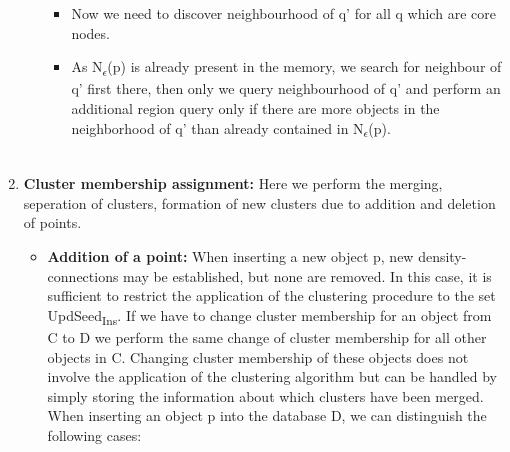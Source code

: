\documentclass[acmsmall]{acmart}
\begin{document}
\begin{enumerate}
\begin{itemize}
\begin{itemize}
            \item Now we need to discover neighbourhood of q' for all q which are core nodes.
            \item As N\textsubscript{$\epsilon$}(p) is already present in the memory, we search for neighbour of q' first there, then only we query neighbourhood of q’ and perform an additional region query only if there are more objects in the neighborhood of q’ than already contained in N\textsubscript{$\epsilon$}(p). \\ \\
        \end{itemize}
        
        
    \end{itemize}

    \item \textbf{Cluster membership assignment: } Here we perform the merging, seperation of clusters, formation of new clusters due to addition and deletion of points. \newline 
    
    \begin{itemize}
        \item \textbf{Addition of a point: }
        When inserting a new object p, new density-connections may be established, but none are removed. In this case, it is sufficient to restrict the application of the clustering procedure
        to the set {UpdSeed\textsubscript{Ins}}. If we have to change cluster membership for an object from C to D we perform the same change of cluster membership for all other objects in C. Changing cluster membership of these objects does not involve the application of the clustering algorithm but can be handled by simply storing the information about which clusters have been merged.
        When inserting an object p into the database D, we can
        distinguish the following cases:
        \\ 


\end{itemize}
\end{enumerate}
\end{document}
